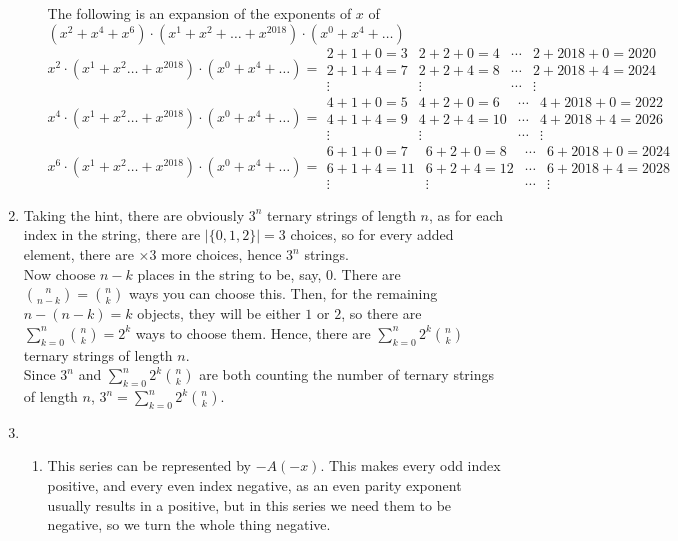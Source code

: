 \documentclass[10pt,english]{article}
\begin{document}
\begin{enumerate}
\begin{enumerate}
The following is an expansion of the exponents of $x$ of $(x^2+x^4+x^6)\cdot(x^1+x^2+\ldots+x^{2018})\cdot(x^0+x^4+\ldots)$ \\ 
$$x^2\cdot(x^1+x^2\ldots+x^{2018})\cdot(x^0+x^4+\ldots)=\begin{matrix}2+1+0=3&2+2+0=4&\cdots&2+2018+0=2020\\ 2+1+4=7&2+2+4=8&\cdots&2+2018+4=2024\\\vdots&\vdots&\cdots&\vdots\end{matrix}$$
$$x^4\cdot(x^1+x^2\ldots+x^{2018})\cdot(x^0+x^4+\ldots)=\begin{matrix}4+1+0=5&4+2+0=6&\cdots&4+2018+0=2022\\ 4+1+4=9&4+2+4=10&\cdots&4+2018+4=2026\\\vdots&\vdots&\cdots&\vdots\end{matrix}$$
$$x^6\cdot(x^1+x^2\ldots+x^{2018})\cdot(x^0+x^4+\ldots)=\begin{matrix}6+1+0=7&6+2+0=8&\cdots&6+2018+0=2024\\ 6+1+4=11&6+2+4=12&\cdots&6+2018+4=2028\\\vdots&\vdots&\cdots&\vdots\end{matrix}$$
    
\end{enumerate}

\pagebreak
\item Taking the hint, there are obviously $3^n$ ternary strings of length $n$, as for each index in the string, there are $|\{0,1,2\}|=3$ choices, so for every added element, there are $\times3$ more choices, hence $3^n$ strings. \\ 
Now choose $n-k$ places in the string to be, say, $0$. There are ${n\choose n-k}={n\choose k}$ ways you can choose this. Then, for the remaining $n-(n-k)=k$ objects, they will be either $1$ or $2$, so there are $\sum_{k=0}^n{n\choose k}=2^k$ ways to choose them. Hence, there are $\sum_{k=0}^n2^k{n\choose k}$ ternary strings of length $n$. \\ 
Since $3^n$ and $\sum_{k=0}^n2^k{n\choose k}$ are both counting the number of ternary strings of length $n$, $3^n=\sum_{k=0}^n2^k{n\choose k}$. 

\pagebreak
\item \begin{enumerate}
    \item This series can be represented by $-A(-x)$. This makes every odd index positive, and every even index negative, as an even parity exponent usually results in a positive, but in this series we need them to be negative, so we turn the whole thing negative. 
    

\end{enumerate}
\end{enumerate}
\end{document}
